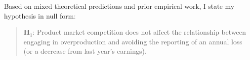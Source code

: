 \documentclass[notitlepage, 12pt]{article}
\begin{document}
%
\begin{comment}
\noindent \textbf{Must explain why you use this.} I follow a recent literature in finance (\citet{fresard:2010}, \citet{valta:2012}) that uses reductions in import tariffs to measure exogenous variation in competitive intensity. I focus on whether product market competition affects managers' engaging in overproduction (a type of real activities manipulation) to avoid missing earnings benchmarks. \citet{bc:2012} use this setting to examine the effect of competition on earnings restatements. %
As the data apply only to manufacturing industries \citet{valta:2012}, and \citet{roychowdhury:2006} shows that overproduction to avoid reporting annual losses is concentrated entirely within manufacturing firms, I believe the setting is a powerful one to investigate the relationship between competition and overproduction to meet earnings benchmarks.
\newline
\end{comment}
%

\noindent Based on mixed theoretical predictions and prior empirical work, I state my hypothesis in null form:
\begin{quote}
$\mathbf{H}_{1}$: Product market competition does not affect the relationship between engaging in overproduction and avoiding the reporting of an annual loss (or a decrease from last year's earnings).
\end{quote}

%
\begin{comment}
\noindent \citet{roychowdhury:2006} posits that managers can manage earnings upward by engaging in overproduction. Higher production levels spread fixed overhead costs over a larger number of units, thereby reducing fixed costs per unit. Assuming that marginal cost per unit does not increase, total cost per unit decreases, resulting in lower reported cost of goods sold.
\newline

\noindent \citet{kst:2012} argue competitive pressure encourages managers to be myopic and engage in short-term actions to improve short-term performance, an example of which is earnings management.
\newline

I focus on abnormal production costs to measure real activities manipulation. \citet{roychowdhury:2006} shows that the cross-sectional relationship between engaging in overproduction and meeting current year earnings and is entirely concentrated within manufacturing firms. The trade data that I use to investigate the causal effect of competition on real activities manipulation only applies to manufacturing firms \citep{valta:2012}.
\newline
\end{comment}
%
\end{document}

